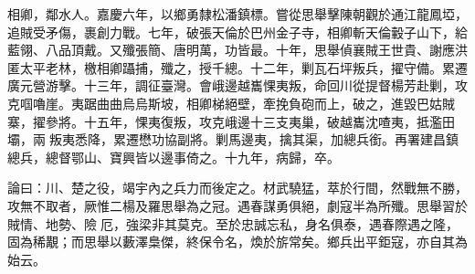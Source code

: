 \begin{pinyinscope}
相卿，鄰水人。嘉慶六年，以鄉勇隸松潘鎮標。嘗從思舉擊陳朝觀於通江龍鳳埡，追賊受矛傷，裹創力戰。七年，破張天倫於巴州金子寺，相卿斬天倫轂子山下，給藍翎、八品頂戴。又殲張簡、唐明萬，功皆最。十年，思舉偵襄賊王世貴、謝應洪匿太平老林，檄相卿躡捕，殲之，授千總。十二年，剿瓦石坪叛兵，擢守備。累遷廣元營游擊。十三年，調征臺灣。會峨邊越巂惈夷叛，命回川從提督楊芳赴剿，攻克啯嚕崖。夷踞曲曲烏烏斯坡，相卿梯絕壁，牽挽負砲而上，破之，進毀巴姑賊寨，擢參將。十五年，惈夷復叛，攻克峨邊十三支夷巢，破越巂沈喳夷，抵濫田壩，兩叛夷悉降，累遷懋功協副將。剿馬邊夷，擒其渠，加總兵銜。再署建昌鎮總兵，總督鄂山、寶興皆以邊事倚之。十九年，病歸，卒。

論曰：川、楚之役，竭宇內之兵力而後定之。材武驍猛，萃於行間，然戰無不勝，攻無不取者，厥惟二楊及羅思舉為之冠。遇春謀勇俱絕，劇寇半為所殲。思舉習於賊情、地勢、險厄，強梁非其莫克。至於忠誠忘私，身名俱泰，遇春際遇之隆，固為稀覯；而思舉以藪澤梟傑，終保令名，煥於旂常矣。鄉兵出平鉅寇，亦自其為始云。


\end{pinyinscope}
